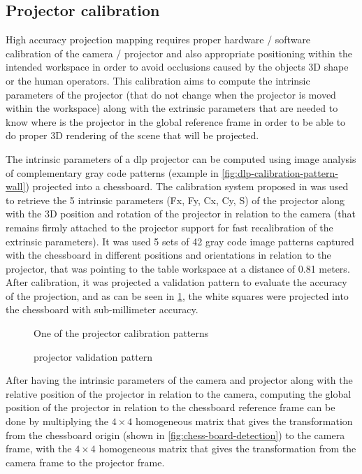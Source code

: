 \subsection{Projector calibration}

High accuracy projection mapping requires proper hardware / software calibration of the camera / projector and also appropriate positioning within the intended workspace in order to avoid occlusions caused by the objects 3D shape or the human operators. This calibration aims to compute the intrinsic parameters of the projector (that do not change when the projector is moved within the workspace) along with the extrinsic parameters that are needed to know where is the projector in the global reference frame in order to be able to do proper 3D rendering of the scene that will be projected.

The intrinsic parameters of a \gls{dlp} projector can be computed using image analysis of complementary gray code patterns (example in \cref{fig:dlp-calibration-pattern-wall}) projected into a chessboard. The calibration system proposed in \cite{Moreno2012} was used to retrieve the 5 intrinsic parameters (Fx, Fy, Cx, Cy, S) of the projector along with the 3D position and rotation of the projector in relation to the camera (that remains firmly attached to the projector support for fast recalibration of the extrinsic parameters). It was used 5 sets of 42 gray code image patterns captured with the chessboard in different positions and orientations in relation to the projector, that was pointing to the table workspace at a distance of 0.81 meters. After calibration, it was projected a validation pattern to evaluate the accuracy of the projection, and as can be seen in \cref{fig:dlp-projected-chessboard}, the white squares were projected into the chessboard with sub-millimeter accuracy.

\begin{figure}[H]
	\begin{floatrow}[2]
		{\caption{One of the  projector calibration patterns}\label{fig:dlp-calibration-pattern-wall}}
		{\caption{ projector validation pattern}\label{fig:dlp-projected-chessboard}}
	\end{floatrow}
\end{figure}

After having the intrinsic parameters of the camera and projector along with the relative position of the projector in relation to the camera, computing the global position of the projector in relation to the chessboard reference frame can be done by multiplying the $4 \times 4$ homogeneous matrix that gives the transformation from the chessboard origin (shown in \cref{fig:chess-board-detection}) to the camera frame, with the $4 \times 4$ homogeneous matrix that gives the transformation from the camera frame to the projector frame.

